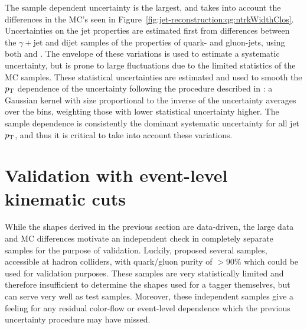 The sample dependent uncertainty is the largest, and takes into account the differences in the MC's seen in Figure~\ref{fig:jet-reconstruction:qg:ntrkWidthClos}. 
Uncertainties on the jet properties are estimated first from differences
between the $\gamma+$jet and dijet samples of the properties of quark- and gluon-jets, using both \Pythia and \Herwigpp. The envelope of these
variations is used to estimate a systematic uncertainty, but is prone to large fluctuations due to the limited statistics of the MC samples. These statistical 
uncertainties
are estimated and used to smooth the $p_{\text{T}}$ dependence of the uncertainty following the
procedure described in \cite{JES2011}: a Gaussian kernel with size proportional to the inverse of the uncertainty averages over the \pt bins, weighting those with lower statistical uncertainty higher. 
The sample dependence is consistently the dominant systematic uncertainty for all jet $p_{\text{T}}$, and thus it is critical to take into account these variations.

\section{Validation with event-level kinematic cuts}
\label{jet-reconstruction:qg:validation}

While the shapes derived in the previous section are data-driven, the large data and MC differences motivate an independent check in completely separate samples for the purpose of validation. Luckily, \cite{schwartz2} proposed several samples, accessible at hadron colliders, with quark/gluon purity of $> 90\%$ which could be used for validation purposes. These samples are very statistically limited and therefore insufficient to determine the shapes used for a tagger themselves, but can serve very well as test samples. Moreover, these independent samples give a feeling for any residual color-flow or event-level dependence which the previous uncertainty procedure may have missed.

